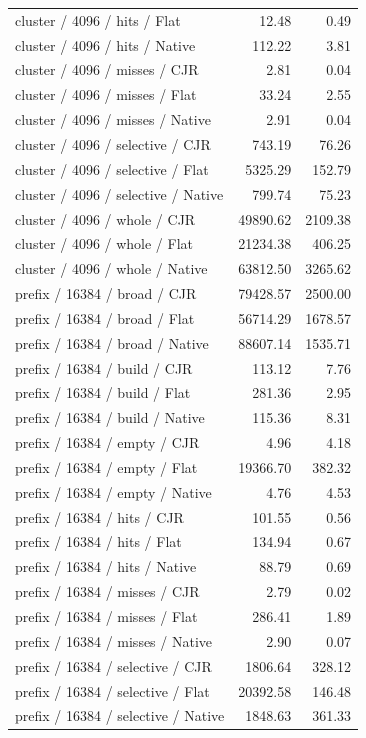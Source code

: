\begin{longtable}{p{}rr}
cluster / 4096 / hits / Flat & 12.48 & 0.49 \\
cluster / 4096 / hits / Native & 112.22 & 3.81 \\
cluster / 4096 / misses / CJR & 2.81 & 0.04 \\
cluster / 4096 / misses / Flat & 33.24 & 2.55 \\
cluster / 4096 / misses / Native & 2.91 & 0.04 \\
cluster / 4096 / selective / CJR & 743.19 & 76.26 \\
cluster / 4096 / selective / Flat & 5325.29 & 152.79 \\
cluster / 4096 / selective / Native & 799.74 & 75.23 \\
cluster / 4096 / whole / CJR & 49890.62 & 2109.38 \\
cluster / 4096 / whole / Flat & 21234.38 & 406.25 \\
cluster / 4096 / whole / Native & 63812.50 & 3265.62 \\
prefix / 16384 / broad / CJR & 79428.57 & 2500.00 \\
prefix / 16384 / broad / Flat & 56714.29 & 1678.57 \\
prefix / 16384 / broad / Native & 88607.14 & 1535.71 \\
prefix / 16384 / build / CJR & 113.12 & 7.76 \\
prefix / 16384 / build / Flat & 281.36 & 2.95 \\
prefix / 16384 / build / Native & 115.36 & 8.31 \\
prefix / 16384 / empty / CJR & 4.96 & 4.18 \\
prefix / 16384 / empty / Flat & 19366.70 & 382.32 \\
prefix / 16384 / empty / Native & 4.76 & 4.53 \\
prefix / 16384 / hits / CJR & 101.55 & 0.56 \\
prefix / 16384 / hits / Flat & 134.94 & 0.67 \\
prefix / 16384 / hits / Native & 88.79 & 0.69 \\
prefix / 16384 / misses / CJR & 2.79 & 0.02 \\
prefix / 16384 / misses / Flat & 286.41 & 1.89 \\
prefix / 16384 / misses / Native & 2.90 & 0.07 \\
prefix / 16384 / selective / CJR & 1806.64 & 328.12 \\
prefix / 16384 / selective / Flat & 20392.58 & 146.48 \\
prefix / 16384 / selective / Native & 1848.63 & 361.33 \\

\end{longtable}
